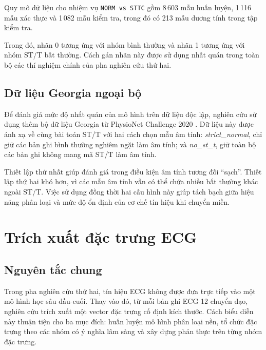 \blocksep

Quy mô dữ liệu cho nhiệm vụ \texttt{NORM vs STTC} gồm 8\,603 mẫu huấn luyện, 1\,116 mẫu xác thực và 1\,082 mẫu kiểm tra, trong đó có 213 mẫu dương tính trong tập kiểm tra.

\blocksep

Trong đó, nhãn 0 tương ứng với nhóm bình thường và nhãn 1 tương ứng với nhóm ST/T bất thường. Cách gán nhãn này được sử dụng nhất quán trong toàn bộ các thí nghiệm chính của pha nghiên cứu thứ hai.

\blocksep

\subsection{Dữ liệu Georgia ngoại bộ}

\blocksep

Để đánh giá mức độ nhất quán của mô hình trên dữ liệu độc lập, nghiên cứu sử dụng thêm bộ dữ liệu Georgia từ PhysioNet Challenge 2020 \cite{Alday2021}. Dữ liệu này được ánh xạ về cùng bài toán ST/T với hai cách chọn mẫu âm tính: \textit{strict\_normal}, chỉ giữ các bản ghi bình thường nghiêm ngặt làm âm tính; và \textit{no\_st\_t}, giữ toàn bộ các bản ghi không mang mã ST/T làm âm tính.

\blocksep

Thiết lập thứ nhất giúp đánh giá trong điều kiện âm tính tương đối “sạch”. Thiết lập thứ hai khó hơn, vì các mẫu âm tính vẫn có thể chứa nhiều bất thường khác ngoài ST/T. Việc sử dụng đồng thời hai cấu hình này giúp tách bạch giữa hiệu năng phân loại và mức độ ổn định của cơ chế tín hiệu khi chuyển miền.

\section{Trích xuất đặc trưng ECG}

\blocksep

\subsection{Nguyên tắc chung}

\blocksep

Trong pha nghiên cứu thứ hai, tín hiệu ECG không được đưa trực tiếp vào một mô hình học sâu đầu-cuối. Thay vào đó, từ mỗi bản ghi ECG 12 chuyển đạo, nghiên cứu trích xuất một vector đặc trưng cố định kích thước. Cách biểu diễn này thuận tiện cho ba mục đích: huấn luyện mô hình phân loại nền, tổ chức đặc trưng theo các nhóm có ý nghĩa lâm sàng và xây dựng phản thực trên từng nhóm đặc trưng.

